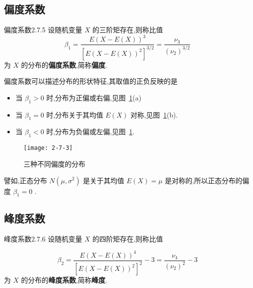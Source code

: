 \subsection{偏度系数}\label{ssec:2.7.5}

\begin{definition}{偏度系数}{2.7.5}
	设随机变量 $ X $ 的三阶矩存在,则称比值
	\begin{equation}
	\beta_{1}=\frac{E(X-E(X))^{3}}{\left[E(X-E(X))^{2}\right]^{3 / 2}}=\frac{\nu_{3}}{\left(\nu_{2}\right)^{3 / 2}} \label{eq:2.7.9}
	\end{equation}
	为 $ X $ 的分布的\textbf{偏度系数},简称\textbf{偏度}.
	
\end{definition}

偏度系数可以描述分布的形状特征,其取值的正负反映的是

\begin{itemize}
	\item 当 $ \beta_{1}>0 $ 时,分布为正偏或右偏,见图~\ref{fig:2.7.3}(a)
	\item 当 $ \beta_{1}=0 $ 时,分布关于其均值 $ E(X) $ 对称,见图~\ref{fig:2.7.3}(b).
	\item 当 $ \beta_{1}<0 $ 时,分布为负偏或左偏,见图~\ref{fig:2.7.3}.
\end{itemize}

\begin{figure}
	\centering
	\texttt{[image: 2-7-3]}
	\caption{三种不同偏度的分布}
	\label{fig:2.7.3}
\end{figure}


譬如,正态分布 $ N\left(\mu, \sigma^{2}\right) $ 是关于其均值 $ E(X)=\mu $ 是对称的,所以正态分布的偏度 $ \beta_{1}=0 $ .

\subsection{峰度系数}\label{ssec:2.7.6}

\begin{definition}{峰度系数}{2.7.6}
	设随机变量 $ X $ 的四阶矩存在,则称比值
	
	\begin{equation}
	\beta_{2}=\frac{E(X-E(X))^{4}}{\left[E(X-E(X))^{2}\right]^{2}}-3=\frac{\nu_{4}}{\left(\nu_{2}\right)^{2}}-3 \label{eq:2.7.10}
	\end{equation}
	为 $ X $ 的分布的\textbf{峰度系数},简称\textbf{峰度}.
\end{definition}

